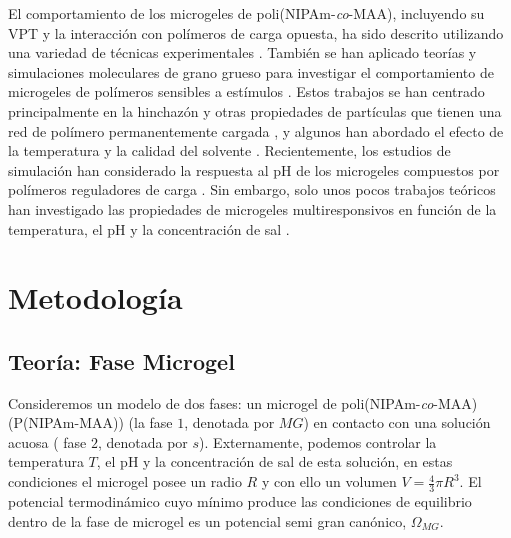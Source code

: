 El comportamiento de los microgeles de poli(NIPAm-\emph{co}-MAA), incluyendo su VPT y la interacci\'on con pol\'imeros de carga opuesta, ha sido descrito utilizando una variedad de t\'ecnicas experimentales \cite{Hoare2004,Dowding2000,Kleinen2008,Kleinen2010,Giussi2015,Su2016,Giussi2020}.
Tambi\'en se han aplicado teor\'ias y simulaciones moleculares de grano grueso para investigar el comportamiento de microgeles de pol\'imeros sensibles a est\'imulos \cite{quesada2011gel,ahualli2016coarse,Landsgesell2019SM}.
Estos trabajos se han centrado principalmente en la hinchaz\'on y otras propiedades de part\'iculas que tienen una red de pol\'imero permanentemente cargada \cite{Levin2002,Claudio2009,Colla2014,Jha2011,jha2012understanding,QuesadaPerez2013,QuesadaPerez2014,Kobayashi2014,Kobayashi2016,Rizzi2016,moncho-jorda2016a,Kobayashi2017,AdroherBenitez2017PCCP}, y algunos han abordado el efecto de la temperatura y la calidad del solvente \cite{Jha2011,QuesadaPerez2013,QuesadaPerez2014,moncho-jorda2016a,ahualli2016coarse,AdroherBenitez2017PCCP}.
Recientemente, los estudios de simulaci\'on han considerado la respuesta al pH de los microgeles compuestos por pol\'imeros reguladores de carga \cite{Schroeder2015,Rudov2017,Sean2018,Hofzumahaus2018,Lu2019}.
Sin embargo, solo unos pocos trabajos te\'oricos han investigado las propiedades de microgeles multiresponsivos en funci\'on de la temperatura, el pH y la concentraci\'on de sal \cite{CaprilesGonzalez2008,polotsky2013collapse}.


\section{Metodolog\'ia}
\subsection{Teor\'ia: Fase Microgel}\label{sec:gel:theory}


Consideremos un modelo de dos fases: un microgel de poli(NIPAm-\emph{co}-MAA) (P(NIPAm-MAA)) (la fase $1$, denotada por $MG$) en contacto con una soluci\'on acuosa ( fase $2$, denotada por $s$).
Externamente, podemos controlar la temperatura $T$, el pH y la concentraci\'on de sal de esta soluci\'on, en estas condiciones el microgel posee un radio $R$ y con ello un volumen $V=\frac{4}{3}\pi R^3$.
El potencial termodin\'amico cuyo m\'inimo produce las condiciones de equilibrio dentro de la fase de microgel es un  potencial semi gran can\'onico, $\Omega_{MG}$.

